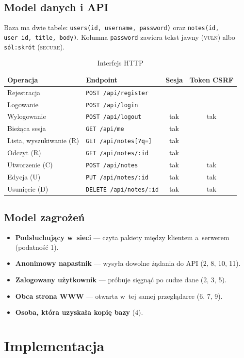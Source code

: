 \documentclass[12pt,a4paper]{article}
\newcommand{\kod}[1]{\texttt{#1}}
\newcommand{\vuln}{\textsc{vuln}}
\newcommand{\secure}{\textsc{secure}}
\begin{document}
\subsection{Model danych i API}
Baza ma dwie tabele: \kod{users(id, username, password)} oraz \kod{notes(id, user\_id, title, body)}. Kolumna \kod{password} zawiera tekst jawny (\vuln) albo \kod{sól:skrót} (\secure).

\begin{table}[H]\centering\caption{Interfejs HTTP}
\begin{tabular}{llcc}
\toprule
Operacja & Endpoint & Sesja & Token CSRF\\\midrule
Rejestracja & \kod{POST /api/register} & & \\
Logowanie & \kod{POST /api/login} & & \\
Wylogowanie & \kod{POST /api/logout} & tak & tak\\
Bieżąca sesja & \kod{GET /api/me} & tak & \\
Lista, wyszukiwanie (R) & \kod{GET /api/notes[?q=]} & tak & \\
Odczyt (R) & \kod{GET /api/notes/:id} & tak & \\
Utworzenie (C) & \kod{POST /api/notes} & tak & tak\\
Edycja (U) & \kod{PUT /api/notes/:id} & tak & tak\\
Usunięcie (D) & \kod{DELETE /api/notes/:id} & tak & tak\\
\bottomrule
\end{tabular}
\end{table}

\subsection{Model zagrożeń}
\begin{itemize}
\item \textbf{Podsłuchujący w~sieci} --- czyta pakiety między klientem a~serwerem (podatność 1).
\item \textbf{Anonimowy napastnik} --- wysyła dowolne żądania do API (2, 8, 10, 11).
\item \textbf{Zalogowany użytkownik} --- próbuje sięgnąć po cudze dane (2, 3, 5).
\item \textbf{Obca strona WWW} --- otwarta w~tej samej przeglądarce (6, 7, 9).
\item \textbf{Osoba, która uzyskała kopię bazy} (4).
\end{itemize}

\section{Implementacja}
\end{document}
